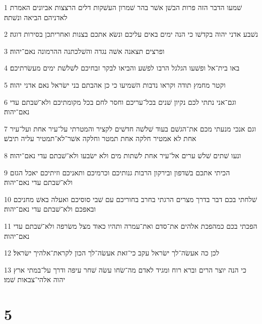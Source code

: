 \par 1 שׁמעו הדבר הזה פרות הבשׁן אשׁר בהר שׁמרון העשׁקות דלים הרצצות אביונים האמרת לאדניהם הביאה ונשׁתה׃
\par 2 נשׁבע אדני יהוה בקדשׁו כי הנה ימים באים עליכם ונשׂא אתכם בצנות ואחריתכן בסירות דוגה׃
\par 3 ופרצים תצאנה אשׁה נגדה והשׁלכתנה ההרמונה נאם־יהוה׃
\par 4 באו בית־אל ופשׁעו הגלגל הרבו לפשׁע והביאו לבקר זבחיכם לשׁלשׁת ימים מעשׂרתיכם׃
\par 5 וקטר מחמץ תודה וקראו נדבות השׁמיעו כי כן אהבתם בני ישׂראל נאם אדני יהוה׃
\par 6 וגם־אני נתתי לכם נקיון שׁנים בכל־עריכם וחסר לחם בכל מקומתיכם ולא־שׁבתם עדי נאם־יהוה׃
\par 7 וגם אנכי מנעתי מכם את־הגשׁם בעוד שׁלשׁה חדשׁים לקציר והמטרתי על־עיר אחת ועל־עיר אחת לא אמטיר חלקה אחת תמטר וחלקה אשׁר־לא־תמטיר עליה תיבשׁ׃
\par 8 ונעו שׁתים שׁלשׁ ערים אל־עיר אחת לשׁתות מים ולא ישׂבעו ולא־שׁבתם עדי נאם־יהוה׃
\par 9 הכיתי אתכם בשׁדפון ובירקון הרבות גנותיכם וכרמיכם ותאניכם וזיתיכם יאכל הגזם ולא־שׁבתם עדי נאם־יהוה׃
\par 10 שׁלחתי בכם דבר בדרך מצרים הרגתי בחרב בחוריכם עם שׁבי סוסיכם ואעלה באשׁ מחניכם ובאפכם ולא־שׁבתם עדי נאם־יהוה׃
\par 11 הפכתי בכם כמהפכת אלהים את־סדם ואת־עמרה ותהיו כאוד מצל משׂרפה ולא־שׁבתם עדי נאם־יהוה׃
\par 12 לכן כה אעשׂה־לך ישׂראל עקב כי־זאת אעשׂה־לך הכון לקראת־אלהיך ישׂראל׃
\par 13 כי הנה יוצר הרים וברא רוח ומגיד לאדם מה־שׂחו עשׂה שׁחר עיפה ודרך על־במתי ארץ יהוה אלהי־צבאות שׁמו׃

\chapter{5}

